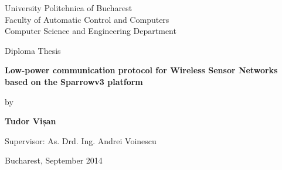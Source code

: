 


\pagestyle{empty}
\sffamily

\noindent
\begin{center}
	\Large
	University Politehnica of Bucharest\\
	Faculty of Automatic Control and Computers \\
	Computer Science and Engineering Department \\
\end{center}

\vfill\vfill
\begin{center}
	\Large
	Diploma Thesis\\
\end{center}

\vfill
\begin{center}
	\HUGE\bfseries
	Low-power communication protocol for Wireless Sensor Networks based on
	the Sparrowv3 platform\\
	\vfill
	\large
\end{center}

\vfill
\begin{center}
	\Large
	by
\end{center}

\vfill
\begin{center}
	\huge\bfseries
	Tudor Vișan
\end{center}

\vfill\vfill\vfill
\begin{center}
	\Large
	Supervisor: As. Drd. Ing. Andrei Voinescu\\
\end{center}

\vfill
\begin{center}
	\large
	Bucharest, September 2014
\end{center}

\cleardoublepage


\pagestyle{headings}
\tableofcontents

